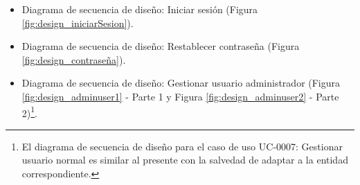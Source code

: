 \documentclass[12pt,a4paper, twoside]{report}
\begin{document}
\begin{itemize}
		\newpage
		
		\item Diagrama de secuencia de diseño: Iniciar sesión (Figura \ref{fig:design_iniciarSesion}).
		
		
		\newpage
		
		\item Diagrama de secuencia de diseño: Restablecer contraseña (Figura \ref{fig:design_contraseña}).

		
		\newpage
		
		\item Diagrama de secuencia de diseño: Gestionar usuario administrador (Figura \ref{fig:design_adminuser1} - Parte 1 y Figura \ref{fig:design_adminuser2} - Parte 2)\footnote{El diagrama de secuencia de diseño para el caso de uso UC-0007: Gestionar usuario normal es similar al presente con la salvedad de adaptar a la entidad correspondiente.}.
		 
%		
%		
		

\end{itemize}
\end{document}
